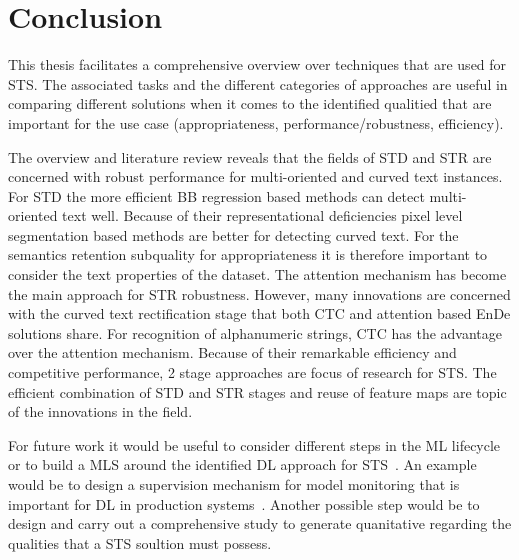\chapter{Conclusion}
This thesis facilitates a comprehensive overview over techniques that are used for \ac{STS}.
The associated tasks and the different categories of approaches are useful in comparing different
solutions when it comes to the identified qualitied that are important for the use case
(appropriateness, performance/robustness, efficiency).

The overview and literature review reveals that the fields of \ac{STD} and \ac{STR} are concerned
with robust performance for multi-oriented and curved text instances.
For \ac{STD} the more efficient \ac{BB} regression based methods can detect multi-oriented text well.
Because of their representational deficiencies pixel level segmentation based methods are better for
detecting curved text.
For the semantics retention subquality for appropriateness it is therefore important to consider
the text properties of the dataset.
The attention mechanism has become the main approach for \ac{STR} robustness.
However, many innovations are concerned with the curved text rectification stage that both
\ac{CTC} and attention based \ac{EnDe} solutions share.
For recognition of alphanumeric strings, \ac{CTC} has the advantage over the attention mechanism.
Because of their remarkable efficiency and competitive performance, 2 stage approaches  are focus
of research for \ac{STS}.
The efficient combination of \ac{STD} and \ac{STR} stages and reuse of feature maps are topic
of the innovations in the field.

For future work it would be useful to consider different steps in the \ac{ML}
lifecycle~\citep{watanabe_preliminary_2019} or to build a \ac{MLS} around the identified \ac{DL}
approach for \ac{STS}~\citep{siebert_construction_2021,nakamichi_requirements-driven_2020}.
An example would be to design a supervision mechanism for model monitoring that is important for
\ac{DL} in production systems~\cite{nakamichi_requirements-driven_2020,watanabe_preliminary_2019}.
Another possible step would be to design and carry out a comprehensive study to generate quanitative
regarding the qualities that a \ac{STS} soultion must possess.
